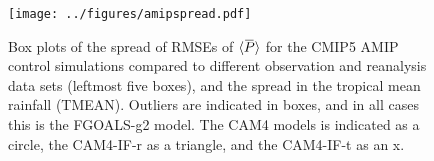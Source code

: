 \documentclass[letterpaper,12pt,titlepage,oneside,final]{book}
\newcommand{\overbar}[1]{\mkern 1.5mu\overline{\mkern-1.5mu#1\mkern-1.5mu}\mkern 1.5mu}
\begin{document}

\begin{figure}[H]
\centering
\noindent\texttt{[image: ../figures/amipspread.pdf]}\hfill
\caption{\footnotesize Box plots of the spread of RMSEs of $\langle\overbar{P}\rangle$ for the CMIP5 AMIP control simulations compared to different observation and reanalysis data sets (leftmost five boxes), and the spread in the tropical mean rainfall (TMEAN). Outliers are indicated in boxes, and in all cases this is the FGOALS-g2 model. The CAM4 models is indicated as a circle, the CAM4-IF-r as a triangle, and the CAM4-IF-t as an x.}
\label{fig:Pspread}
\end{figure}
\end{document}
